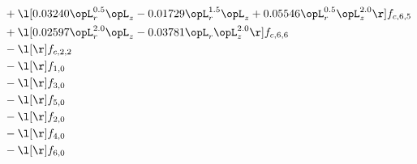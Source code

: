 \begin{alignat}{2}
& + \l[  0.03240 \opL_r^{0.5} \opL_z   -0.01729 \opL_r^{1.5} \opL_z +  0.05546 \opL_r^{0.5} \opL_z^{2.0}  \r] f_{c,6,5} \nonumber \\ 
& + \l[  0.02597 \opL_r^{2.0} \opL_z   -0.03781 \opL_r \opL_z^{2.0}  \r] f_{c,6,6} \nonumber \\ 
& - \l[  \r] f_{c,2,2} \nonumber \\ 
& - \l[  \r] f_{1,0} \nonumber \\ 
& - \l[  \r] f_{3,0} \nonumber \\ 
& - \l[  \r] f_{5,0} \nonumber \\ 
& - \l[  \r] f_{2,0} \nonumber \\ 
& - \l[  \r] f_{4,0} \nonumber \\ 
& - \l[  \r] f_{6,0} \nonumber \\ 
\end{alignat} 


